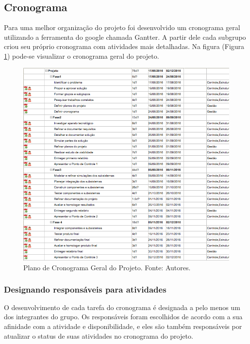 \subsection{Cronograma}

Para uma melhor organização do projeto foi desenvolvido um cronograma geral utilizando a ferramenta do google chamada Gantter. A partir dele cada subgrupo criou seu próprio cronograma com atividades mais detalhadas. Na figura (Figura \ref{fig:cronogramaGeral}) pode-se visualizar o cronograma geral do projeto.

\begin{figure}[htpb!]
    \centering
    \includegraphics[scale= 0.7]{figuras/CronogramaGeral.png}
    \caption[Escopo]{Plano de Cronograma Geral do Projeto. Fonte: Autores.}
    \label{fig:cronogramaGeral}
\end{figure}

\subsubsection{Designando responsáveis para atividades}
O desenvolvimento de cada tarefa do cronograma é designada a pelo menos um dos integrantes do grupo. Os responsáveis foram escolhidos de acordo com a sua afinidade com a atividade e disponibilidade, e eles são também responsáveis por atualizar o status de suas atividades no cronograma do projeto.

